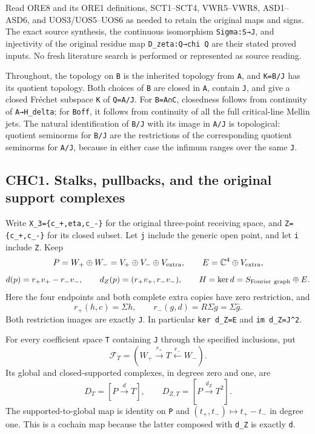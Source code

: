 Read ORE8 and its ORE1 definitions, SCT1--SCT4, VWR5--VWR8, ASD1--ASD6,
and UOS3/UOS5--UOS6 as needed to retain the original maps and signs. The
exact source synthesis, the continuous isomorphism \texttt{Sigma:S→J},
and injectivity of the original residue map
\texttt{D\_zeta:Q→chi\ Q\textquotesingle{}} are their stated proved
inputs. No fresh literature search is performed or represented as source
reading.

Throughout, the topology on \texttt{B} is the inherited topology from
\texttt{A}, and \texttt{K=B/J} has its quotient topology. Both choices
of \texttt{B} are closed in \texttt{A}, contain \texttt{J}, and give a
closed Fréchet subspace \texttt{K} of \texttt{Q=A/J}. For
\texttt{B=A∩C}, closedness follows from continuity of
\texttt{A→H\_delta}; for \texttt{Boff}, it follows from continuity of
all the full critical-line Mellin jets. The natural identification of
\texttt{B/J} with its image in \texttt{A/J} is topological: quotient
seminorms for \texttt{B/J} are the restrictions of the corresponding
quotient seminorms for \texttt{A/J}, because in either case the infimum
ranges over the same \texttt{J}.

\subsection{CHC1. Stalks, pullbacks, and the original support
complexes}\label{chc1.-stalks-pullbacks-and-the-original-support-complexes}

Write \texttt{X\_3=\{c\_+,eta,c\_-\}} for the original three-point
receiving space, and \texttt{Z=\{c\_+,c\_-\}} for its closed subset. Let
\texttt{j} include the generic open point, and let \texttt{i} include
\texttt{Z}. Keep \[
P=W_+\oplus W_-
=V_+\oplus V_-\oplus V_{\rm extra},
\qquad
E=\mathbb C^4\oplus V_{\rm extra},
\] \[
d(p)=r_+v_+-r_-v_-,\qquad
d_Z(p)=(r_+v_+,r_-v_-),\qquad
H=\ker d=S_{\rm Fourier\ graph}\oplus E.
\] Here the four endpoints and both complete extra copies have zero
restriction, and \[
r_+(h,c)=\Sigma h,\qquad r_-(g,d)=R\Sigma g=\Sigma\widehat g.
\] Both restriction images are exactly \texttt{J}. In particular
\texttt{ker\ d\_Z=E} and \texttt{im\ d\_Z=J\^{}2}.

For every coefficient space \texttt{T} containing \texttt{J} through the
specified inclusions, put \[
\mathcal F_T=(W_+\xrightarrow{r_+}T\xleftarrow{r_-}W_-).
\] Its global and closed-supported complexes, in degrees zero and one,
are \[
D_T=[P\xrightarrow d T],\qquad
D_{Z,T}=[P\xrightarrow{d_Z}T^2].
\tag{CHC1.1}
\] The supported-to-global map is identity on \texttt{P} and
\((t_+,t_-)\mapsto t_+-t_-\) in degree one. This is a cochain map
because the latter composed with \texttt{d\_Z} is exactly \texttt{d}.

